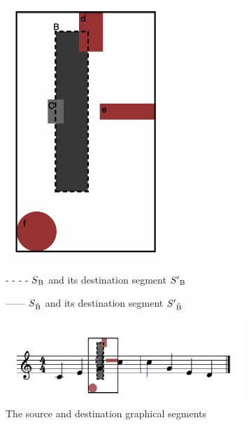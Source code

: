 \documentclass[a4paper]{article}
\begin{document}
\begin{figure}[h]
\begin{multicols}{2}
\begin{center}
\includegraphics[width=6cm]{img/score3.png} 
\end{center}
\columnbreak

\bigskip

\begin{center}
 - - - -  $S\textsubscript{B}$ and its destination segment $S'\textsubscript{B}$

\bigskip

 ------  $S\textsubscript{\r{B}}$ and its destination segment $S'\textsubscript{\r{B}}$

\bigskip

\includegraphics[width=9cm]{img/scorefinalbox.png}

\end{center}

\end{multicols}

\caption{The source and destination graphical segments}
\label{fig:mapping}

\end{figure}

\end{document}
